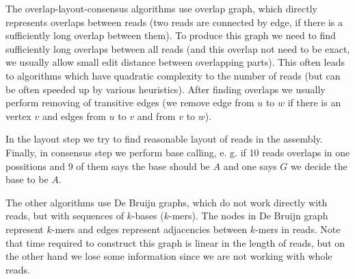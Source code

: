 The overlap-layout-consensus algorithms use overlap graph, which directly represents
overlaps between reads (two reads are connected by edge, if there is a sufficiently long overlap between them).
To produce this graph we need to find sufficiently long
overlaps between all reads (and this overlap not need to be exact, we usually allow small edit distance between overlapping parts).
This often leads to algorithms which have quadratic
complexity to the number of reads (but can be often speeded up by various heuristics).
After finding overlaps we usually perform removing of transitive edges (we remove edge
from $u$ to $w$ if there is an vertex $v$ and edges from $u$ to $v$ and from $v$ to $w$).

In the layout step we try to find reasonable layout of reads in the assembly.
Finally, in consensus step we perform base calling, e. g. if 10 reads overlaps in
one possitions and 9 of them says the base should be $A$ and one says $G$ we decide the base to
be $A$.


\medskip

The other algorithms use De Bruijn graphs, which do not work directly with reads, but
with sequences of $k$-bases ($k$-mers). The nodes in De Bruijn graph represent $k$-mers
and edges represent adjacencies between $k$-mers in reads. Note that time
required to construct this graph is linear in the length of reads, but on the other hand
we lose some information since we are not working with whole reads.
